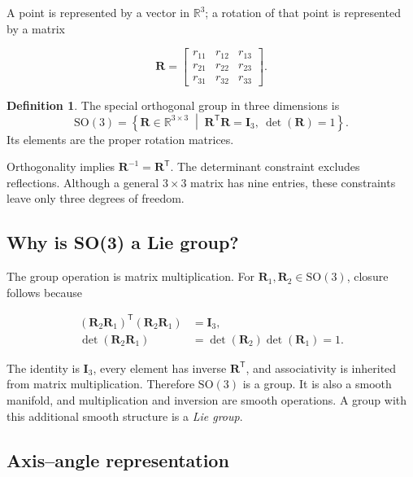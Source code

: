 \documentclass[10pt,a4paper]{article}
\numberwithin{equation}{section}
\newcommand{\Subsection}[1]{\subsection{#1}}
\newcommand{\SOthree}{\mathrm{SO}(3)}
\theoremstyle{definition}
\newtheorem{definition}{Definition}[section]
\theoremstyle{exercisestyle}
\begin{document}
A point is represented by a vector in $\mathbb{R}^3$; a rotation of that point
is represented by a matrix

\begin{equation}
    \mathbf{R} = \begin{bmatrix}
        r_{11} & r_{12} & r_{13} \\
        r_{21} & r_{22} & r_{23} \\
        r_{31} & r_{32} & r_{33}
    \end{bmatrix}.
    \label{eq:rotation-matrix}
\end{equation}

\begin{definition}
    The special orthogonal group in three dimensions is
    \begin{equation}
        \SOthree =
        \left\{\mathbf{R}\in\mathbb{R}^{3\times3}
        \;\middle|\;
        \mathbf{R}^{\mathsf T}\mathbf{R}=\mathbf{I}_3,
        \ \det(\mathbf{R})=1\right\}.
        \label{eq:so3-definition}
    \end{equation}
    Its elements are the proper rotation matrices.
\end{definition}

Orthogonality implies
$\mathbf{R}^{-1}=\mathbf{R}^{\mathsf T}$. The determinant constraint excludes
reflections. Although a general $3\times3$ matrix has nine entries, these
constraints leave only three degrees of freedom.

\Subsection{Why is SO(3) a Lie group?}

The group operation is matrix multiplication. For
$\mathbf{R}_1,\mathbf{R}_2\in\SOthree$, closure follows because

\begin{align}
    (\mathbf{R}_2\mathbf{R}_1)^{\mathsf T}
    (\mathbf{R}_2\mathbf{R}_1) & = \mathbf{I}_3,                           \\
    \det(\mathbf{R}_2\mathbf{R}_1)
                               & = \det(\mathbf{R}_2)\det(\mathbf{R}_1)=1.
\end{align}

The identity is $\mathbf{I}_3$, every element has inverse
$\mathbf{R}^{\mathsf T}$, and associativity is inherited from matrix
multiplication. Therefore $\SOthree$ is a group. It is also a smooth manifold,
and multiplication and inversion are smooth operations. A group with this
additional smooth structure is a \emph{Lie group}.

\Subsection{Axis--angle representation}
\end{document}

